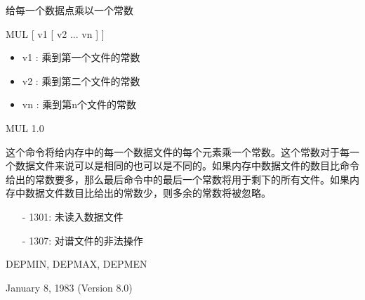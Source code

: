 \label{cmd:mul}

给每一个数据点乘以一个常数

MUL [ v1 [ v2 ... vn ] ]

\begin{itemize}
\item v1 :  乘到第一个文件的常数 
\item v2 :  乘到第二个文件的常数 
\item vn : 乘到第n个文件的常数 
\end{itemize}

MUL 1.0

这个命令将给内存中的每一个数据文件的每个元素乘一个常数。这个常数对于每一个数据文件来说可以是相同的也可以是不同的。如果内存中数据文件的数目比命令给出的常数要多，那么最后命令中的最后一个常数将用于剩下的所有文件。如果内存中数据文件数目比给出的常数少，则多余的常数将被忽略。

\begin{itemize}
\item[-]1301: 未读入数据文件
\item[-]1307: 对谱文件的非法操作
\end{itemize}

DEPMIN, DEPMAX, DEPMEN

January 8, 1983 (Version 8.0)
